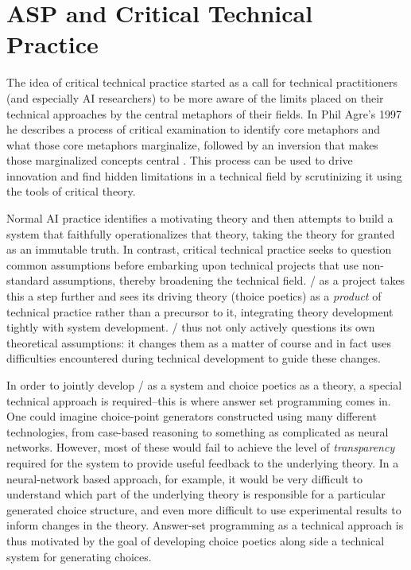 
\section{ASP and Critical Technical Practice}
\label{sec:dunyazad-asp-and-ctp}

The idea of critical technical practice started as a call for technical practitioners (and especially AI researchers) to be more aware of the limits placed on their technical approaches by the central metaphors of their fields.
%
In Phil Agre's 1997  he describes a process of critical examination to identify core metaphors and what those core metaphors marginalize, followed by an inversion that makes those marginalized concepts central \cite{Agre1997}.
%
This process can be used to drive innovation and find hidden limitations in a technical field by scrutinizing it using the tools of critical theory.


Normal AI practice identifies a motivating theory and then attempts to build a system that faithfully operationalizes that theory, taking the theory for granted as an immutable truth.
%
In contrast, critical technical practice seeks to question common assumptions before embarking upon technical projects that use non-standard assumptions, thereby broadening the technical field.
%
\dunyazad/ as a project takes this a step further and sees its driving theory (thoice poetics) as a \emph{product} of technical practice rather than a precursor to it, integrating theory development tightly with system development.
%
\dunyazad/ thus not only actively questions its own theoretical assumptions: it changes them as a matter of course and in fact uses difficulties encountered during technical development to guide these changes.


In order to jointly develop \dunyazad/ as a system and choice poetics as a theory, a special technical approach is required--this is where answer set programming comes in.
%
One could imagine choice-point generators constructed using many different technologies, from case-based reasoning to something as complicated as neural networks.
%
However, most of these would fail to achieve the level of \emph{transparency} required for the system to provide useful feedback to the underlying theory.
%
In a neural-network based approach, for example, it would be very difficult to understand which part of the underlying theory is responsible for a particular generated choice structure, and even more difficult to use experimental results to inform changes in the theory.
%
Answer-set programming as a technical approach is thus motivated by the goal of developing choice poetics along side a technical system for generating choices.


